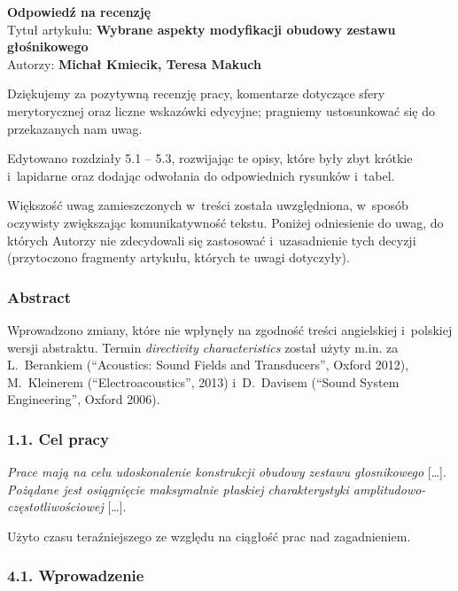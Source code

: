 \documentclass[12pt]{article}
\begin{document}
    
    \begin{center}
        \textbf{Odpowiedź na recenzję }\\
        \vspace{10pt}
        Tytuł artykułu: \textbf{Wybrane aspekty modyfikacji obudowy zestawu głośnikowego} \\
        Autorzy: \textbf{Michał Kmiecik, Teresa Makuch}
    \end{center}
    

    Dziękujemy za pozytywną recenzję pracy, komentarze dotyczące sfery merytorycznej oraz liczne wskazówki edycyjne; pragniemy ustosunkować się do przekazanych nam uwag.
    
    Edytowano rozdziały 5.1 -- 5.3, rozwijając te opisy, które były zbyt krótkie i~lapidarne oraz dodając odwołania do odpowiednich rysunków i~tabel.
    
    Większość uwag zamieszczonych w~treści została uwzględniona, w~sposób oczywisty zwiększając komunikatywność tekstu. Poniżej odniesienie do uwag, do których Autorzy nie zdecydowali się zastosować i~uzasadnienie tych decyzji (przytoczono fragmenty artykułu, których te uwagi dotyczyły).
    
    \subsubsection*{Abstract}
    
    Wprowadzono zmiany, które nie wpłynęły na zgodność treści angielskiej i~polskiej wersji abstraktu. Termin \textit{directivity characteristics} został użyty m.in. za L.~Berankiem (\textquotedblleft Acoustics: Sound Fields and Transducers\textquotedblright, Oxford 2012), M.~Kleinerem (\textquotedblleft Electroacoustics\textquotedblright, 2013) i~D.~Davisem (\textquotedblleft Sound System Engineering\textquotedblright, Oxford 2006).
    
    \subsubsection*{1.1. Cel pracy}
    
    \textit{Prace mają na celu udoskonalenie konstrukcji obudowy zestawu głosnikowego} [\dots]. \textit{Pożądane jest osiągnięcie maksymalnie
    płaskiej charakterystyki amplitudowo-częstotliwościowej} [\dots].
    
    Użyto czasu teraźniejszego ze względu na ciągłość prac nad zagadnieniem.
    
    \subsubsection*{4.1. Wprowadzenie}
    
\end{document}
